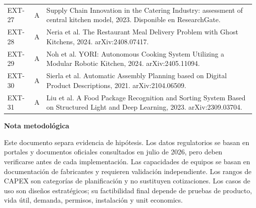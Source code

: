 \documentclass[11pt,a4paper]{article}
\newcommand{\etiqueta}[1]{\par\medskip\noindent\textbf{#1}\par\nopagebreak\smallskip}
\begin{document}
{\begin{xltabular}{\textwidth}{@{}P{1.4cm}P{1cm}L@{}}
EXT-27 & A & Supply Chain Innovation in the Catering Industry: assessment of central kitchen model, 2023. Disponible en ResearchGate.\\
EXT-28 & A & Neria et al. The Restaurant Meal Delivery Problem with Ghost Kitchens, 2024. arXiv:2408.07417.\\
EXT-29 & A & Noh et al. YORI: Autonomous Cooking System Utilizing a Modular Robotic Kitchen, 2024. arXiv:2405.11094.\\
EXT-30 & A & Sierla et al. Automatic Assembly Planning based on Digital Product Descriptions, 2021. arXiv:2104.06509.\\
EXT-31 & A & Liu et al. A Food Package Recognition and Sorting System Based on Structured Light and Deep Learning, 2023. arXiv:2309.03704.\\
\bottomrule
\end{xltabular}}

\etiqueta{Nota metodológica}
Este documento separa evidencia de hipótesis. Los datos regulatorios se basan en portales y documentos
oficiales consultados en julio de 2026, pero deben verificarse antes de cada implementación. Las
capacidades de equipos se basan en documentación de fabricantes y requieren validación independiente.
Los rangos de CAPEX son categorías de planificación y no sustituyen cotizaciones. Los casos de uso son
diseños estratégicos; su factibilidad final depende de pruebas de producto, vida útil, demanda, permisos,
instalación y unit economics.
\end{document}
